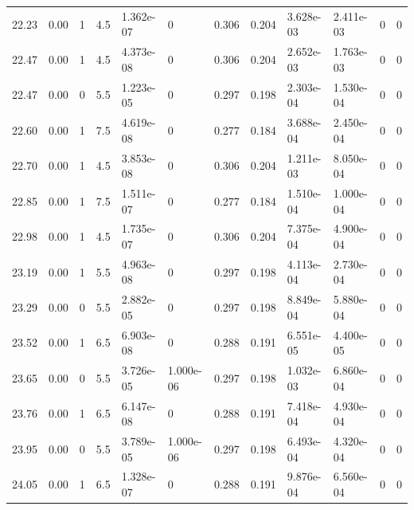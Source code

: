 \documentclass[preview]{standalone}
\begin{document}
{{{\begin{tabular}{L{1.2cm}C{1.2cm} C{0.3cm}C{0.5cm} C{1.4cm}C{1.4cm} C{1.4cm}C{1.4cm} C{1.6cm}C{1.6cm} C{1.6cm}C{1.6cm}}
  22.23  &  0.00  & 1     & 4.5 &  1.362e-07  & 0  &  0.306&   0.204& 3.628e-03 & 2.411e-03   &  0 & 0  \\ 
  22.47  &  0.00  & 1     & 4.5 &  4.373e-08  & 0  &  0.306&   0.204& 2.652e-03 & 1.763e-03   &  0 & 0  \\ 
  22.47  &  0.00  & 0     & 5.5 &  1.223e-05  & 0  &  0.297&   0.198& 2.303e-04 & 1.530e-04   &  0 & 0  \\ 
  22.60  &  0.00  & 1     & 7.5 &  4.619e-08  & 0  &  0.277&   0.184& 3.688e-04 & 2.450e-04   &  0 & 0  \\ 
  22.70  &  0.00  & 1     & 4.5 &  3.853e-08  & 0  &  0.306&   0.204& 1.211e-03 & 8.050e-04   &  0 & 0  \\ 
  22.85  &  0.00  & 1     & 7.5 &  1.511e-07  & 0  &  0.277&   0.184& 1.510e-04 & 1.000e-04   &  0 & 0  \\ 
  22.98  &  0.00  & 1     & 4.5 &  1.735e-07  & 0  &  0.306&   0.204& 7.375e-04 & 4.900e-04   &  0 & 0  \\ 
  23.19  &  0.00  & 1     & 5.5 &  4.963e-08  & 0  &  0.297&   0.198& 4.113e-04 & 2.730e-04   &  0 & 0  \\ 
  23.29  &  0.00  & 0     & 5.5 &  2.882e-05  & 0  &  0.297&   0.198& 8.849e-04 & 5.880e-04   &  0 & 0  \\ 
  23.52  &  0.00  & 1     & 6.5 &  6.903e-08  & 0  &  0.288&   0.191& 6.551e-05 & 4.400e-05   &  0 & 0  \\ 
  23.65  &  0.00  & 0     & 5.5 &  3.726e-05  & 1.000e-06  &  0.297&   0.198& 1.032e-03 & 6.860e-04   &  0 & 0  \\ 
  23.76  &  0.00  & 1     & 6.5 &  6.147e-08  & 0  &  0.288&   0.191& 7.418e-04 & 4.930e-04   &  0 & 0  \\ 
  23.95  &  0.00  & 0     & 5.5 &  3.789e-05  & 1.000e-06  &  0.297&   0.198& 6.493e-04 & 4.320e-04   &  0 & 0  \\ 
  24.05  &  0.00  & 1     & 6.5 &  1.328e-07  & 0  &  0.288&   0.191& 9.876e-04 & 6.560e-04   &  0 & 0  \\ 
\hline 
\end{tabular} 

}}}
\end{document}
